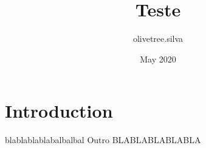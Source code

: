 \documentclass{article}
\title{Teste}
\author{olivetree.silva }
\date{May 2020}
\begin{document}
\maketitle

\section{Introduction}
blablablablabalbalbal
Outro BLABLABLABLABLA
\end{document}
